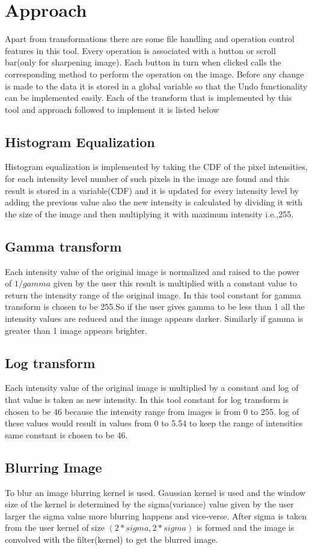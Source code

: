 \documentclass{article}
\begin{document}
\section{Approach}
\label{sec:pagestyle}
Apart from transformations there are some file handling and operation control features in this tool. Every operation is associated with a button or scroll bar(only for sharpening image). Each button in turn when clicked calls the corresponding method to perform the operation on the image. Before any change is made to the data it is stored in a global variable so that the Undo functionality can be implemented easily. Each of the transform that is implemented by this tool and approach followed to implement it is listed below
\subsection{Histogram Equalization}
Histogram equalization\cite{WEBSITE:4} is implemented by taking the CDF of the pixel intensities, for each intensity level number of such pixels in the image are found and this result is stored in a variable(CDF) and it is updated for every intensity level by adding the previous value also the new intensity is calculated by dividing it with the size of the image and then multiplying it with maximum intensity i.e.,255.
\subsection{Gamma transform}
Each intensity value of the original image is normalized and raised to the power of $1/gamma$ given by the user this result is multiplied with a constant value to return the intensity range of the original image. In this tool constant for gamma transform\cite{WEBSITE:12} is chosen to be 255.So if the user gives gamma to be less than 1 all the intensity values are reduced and the image appears darker. Similarly if gamma is greater than 1 image appears brighter.
\subsection{Log transform}
Each intensity value of the original image is multiplied by a constant and log of that value is taken as new intensity. In this tool constant for log transform is chosen to be 46 because the intensity range from images is from 0 to 255. log of these values would result in values from 0 to 5.54 to keep the range of intensities same constant is chosen to be 46.
\subsection{Blurring Image}
To blur an image blurring kernel is used. Gaussian kernel is used and the window size of the kernel is determined by the sigma(variance) value given by the user larger the sigma value more blurring happens and vice-verse. After sigma is taken from the user kernel of size $(2*sigma,2*sigma)$ is formed and the image is convolved with the filter(kernel) to get the blurred image. 
\end{document}
